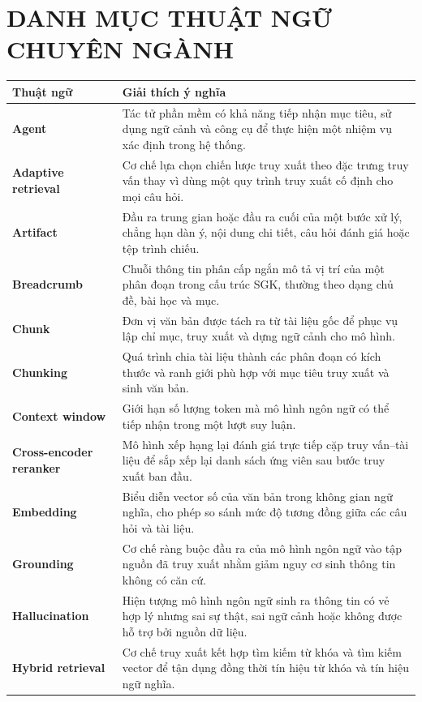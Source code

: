 \documentclass[../DoAn.tex]{subfiles}
\begin{document}
\chapter*{DANH MỤC THUẬT NGỮ CHUYÊN NGÀNH}

\begin{longtable}{p{3.7cm} p{9.8cm}}
\hline
\textbf{Thuật ngữ} & \textbf{Giải thích ý nghĩa} \\ \hline
\textbf{Agent} & Tác tử phần mềm có khả năng tiếp nhận mục tiêu, sử dụng ngữ cảnh và công cụ để thực hiện một nhiệm vụ xác định trong hệ thống. \\
\textbf{Adaptive retrieval} & Cơ chế lựa chọn chiến lược truy xuất theo đặc trưng truy vấn thay vì dùng một quy trình truy xuất cố định cho mọi câu hỏi. \\
\textbf{Artifact} & Đầu ra trung gian hoặc đầu ra cuối của một bước xử lý, chẳng hạn dàn ý, nội dung chi tiết, câu hỏi đánh giá hoặc tệp trình chiếu. \\
\textbf{Breadcrumb} & Chuỗi thông tin phân cấp ngắn mô tả vị trí của một phân đoạn trong cấu trúc SGK, thường theo dạng chủ đề, bài học và mục. \\
\textbf{Chunk} & Đơn vị văn bản được tách ra từ tài liệu gốc để phục vụ lập chỉ mục, truy xuất và dựng ngữ cảnh cho mô hình. \\
\textbf{Chunking} & Quá trình chia tài liệu thành các phân đoạn có kích thước và ranh giới phù hợp với mục tiêu truy xuất và sinh văn bản. \\
\textbf{Context window} & Giới hạn số lượng token mà mô hình ngôn ngữ có thể tiếp nhận trong một lượt suy luận. \\
\textbf{Cross-encoder reranker} & Mô hình xếp hạng lại đánh giá trực tiếp cặp truy vấn--tài liệu để sắp xếp lại danh sách ứng viên sau bước truy xuất ban đầu. \\
\textbf{Embedding} & Biểu diễn vector số của văn bản trong không gian ngữ nghĩa, cho phép so sánh mức độ tương đồng giữa các câu hỏi và tài liệu. \\
\textbf{Grounding} & Cơ chế ràng buộc đầu ra của mô hình ngôn ngữ vào tập nguồn đã truy xuất nhằm giảm nguy cơ sinh thông tin không có căn cứ. \\
\textbf{Hallucination} & Hiện tượng mô hình ngôn ngữ sinh ra thông tin có vẻ hợp lý nhưng sai sự thật, sai ngữ cảnh hoặc không được hỗ trợ bởi nguồn dữ liệu. \\
\textbf{Hybrid retrieval} & Cơ chế truy xuất kết hợp tìm kiếm từ khóa và tìm kiếm vector để tận dụng đồng thời tín hiệu từ khóa và tín hiệu ngữ nghĩa. \\

\end{longtable}
\end{document}
